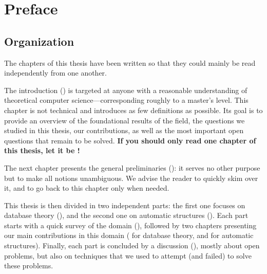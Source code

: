\chapter*{Preface}

\section*{Organization}

The chapters of this thesis have been written so that they could mainly
be read independently from one another.

The introduction () is targeted at anyone with
a reasonable understanding of theoretical computer science---corresponding roughly
to a master's level. This chapter is not technical and introduces as few definitions
as possible. Its goal is to provide an overview of the foundational results of the
field, the questions we studied in this thesis, our contributions, as well
as the most important open questions that remain to be solved.
\textbf{If you should only read one chapter of this thesis, let it be !}

The next chapter presents the general preliminaries ():
it serves no other purpose but to make all notions unambiguous. We advise
the reader to quickly skim over it, and to go back to this chapter only when
needed.

This thesis is then divided in two independent parts:
the first one focuses on database theory (),
and the second one on automatic structures ().
Each part starts with a quick survey of the domain
(),
followed by two chapters presenting our main contributions in this domain
( for database theory,
and  for automatic structures).
Finally, each part is concluded by a discussion (),
mostly about open problems, but also on techniques that we used to attempt (and failed) to solve these problems.

